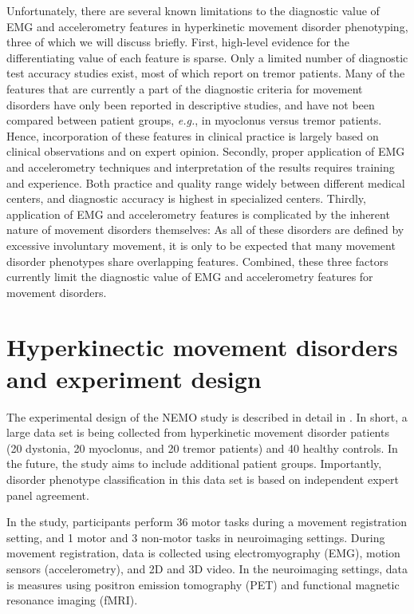 Unfortunately, there are several known limitations to the diagnostic value of EMG and accelerometry features in hyperkinetic movement disorder phenotyping, three of which we will discuss briefly. First, high-level evidence for the differentiating value of each feature is sparse. Only a limited number of diagnostic test accuracy studies exist, most of which report on tremor patients. Many of the features that are currently a part of the diagnostic criteria for movement disorders have only been reported in descriptive studies, and have not been compared between patient groups, \emph{e.g.}, in myoclonus versus tremor patients. Hence, incorporation of these features in clinical practice is largely based on clinical observations and on expert opinion. Secondly, proper application of EMG and accelerometry techniques and interpretation of the results requires training and experience. Both practice and quality range widely between different medical centers, and diagnostic accuracy is highest in specialized centers. Thirdly, application of EMG and accelerometry features is complicated by the inherent nature of movement disorders themselves: As all of these disorders are defined by excessive involuntary movement, it is only to be expected that many movement disorder phenotypes share overlapping features. Combined, these three factors currently limit the diagnostic value of EMG and accelerometry features for movement disorders.

\section{Hyperkinectic movement disorders and experiment design} \label{experiment}
%
%
The experimental design of the NEMO study is described in detail in \citep{NEMO}. In short, a large data set is being collected from hyperkinetic movement disorder patients (20 dystonia, 20 myoclonus, and 20 tremor patients) and 40 healthy controls. In the future, the study aims to include additional patient groups. Importantly, disorder phenotype classification in this data set is based on independent expert panel agreement.

In the study, participants perform 36 motor tasks during a movement registration setting, and 1 motor and 3 non-motor tasks in neuroimaging settings. During movement registration, data is collected using electromyography (EMG), motion sensors (accelerometry), and 2D and 3D video. In the neuroimaging settings, data is measures using positron emission tomography (PET) and functional magnetic resonance imaging (fMRI).  

